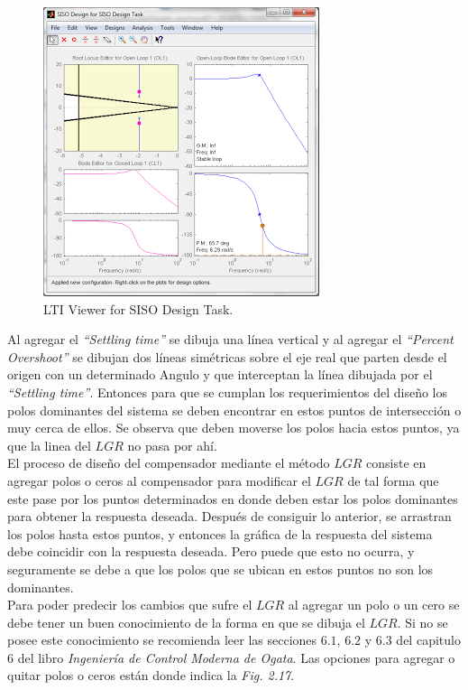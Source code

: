 \documentclass[a4paper,12pt,twoside]{proyectotanquesecci}
\begin{document}
\begin{figure}[h]
\centering
\includegraphics[scale=0.6]{Ventana10}
\renewcommand{\figurename}{Fig.}
\caption{LTI Viewer for SISO Design Task.}
\label{LTI Viewer for SISO Design Task.}
\end{figure}

Al agregar el \textit{“Settling time”} se dibuja una línea vertical  y al agregar el \textit{“Percent Overshoot”} se dibujan dos líneas simétricas sobre el eje real que parten desde el origen con un determinado Angulo y que interceptan la línea dibujada por el \textit{“Settling time”}. Entonces para que se cumplan los requerimientos del diseño los polos dominantes del sistema se deben encontrar en estos puntos de intersección o muy cerca de ellos. Se observa que deben moverse los polos hacia estos puntos, ya que la linea del $LGR$ no pasa por ahí. \\

El proceso de diseño del compensador mediante el método $LGR$ consiste en agregar polos o ceros al compensador para modificar el $LGR$ de tal forma que este pase por los puntos determinados en donde deben estar los polos dominantes para obtener la respuesta deseada. Después de consiguir lo anterior, se arrastran los polos  hasta estos puntos, y entonces la gráfica de la respuesta del sistema debe coincidir con la respuesta deseada. Pero puede que esto no ocurra, y seguramente se debe a que los polos que se ubican en estos puntos no son los dominantes. \\

Para poder predecir los cambios que sufre el $LGR$ al agregar un polo o un cero se debe tener un buen conocimiento de la forma en que se dibuja el $LGR$. Si no se posee este conocimiento se recomienda leer las secciones $6.1$, $6.2$ y $6.3$ del capitulo 6 del libro \textit{Ingeniería de Control Moderna de Ogata}. Las opciones para agregar o quitar polos o ceros están donde indica la \textit{Fig. 2.17}. \\
\end{document}
